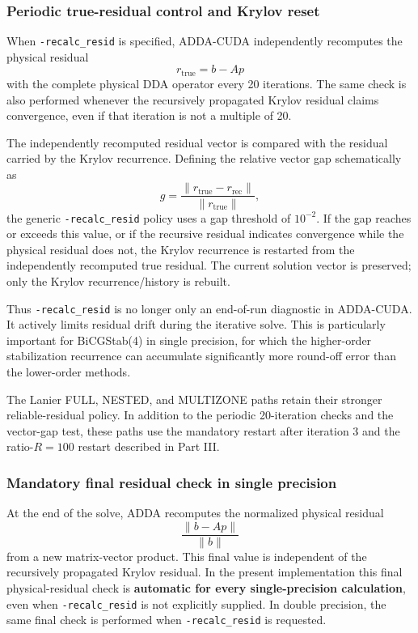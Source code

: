 \documentclass[11pt,a4paper]{article}
\begin{document}
\subsubsection{Periodic true-residual control and Krylov reset}

When \texttt{-recalc\_resid} is specified, ADDA-CUDA independently recomputes the physical residual
\begin{equation}
r_{\mathrm{true}}=b-Ap
\end{equation}
with the complete physical DDA operator every 20 iterations. The same check is also performed whenever the recursively propagated Krylov residual claims convergence, even if that iteration is not a multiple of 20.

The independently recomputed residual vector is compared with the residual carried by the Krylov recurrence. Defining the relative vector gap schematically as
\begin{equation}
 g = \frac{\lVert r_{\mathrm{true}}-r_{\mathrm{rec}}\rVert}
 {\lVert r_{\mathrm{true}}\rVert},
\end{equation}
the generic \texttt{-recalc\_resid} policy uses a gap threshold of \(10^{-2}\). If the gap reaches or exceeds this value, or if the recursive residual indicates convergence while the physical residual does not, the Krylov recurrence is restarted from the independently recomputed true residual. The current solution vector is preserved; only the Krylov recurrence/history is rebuilt.

Thus \texttt{-recalc\_resid} is no longer only an end-of-run diagnostic in ADDA-CUDA. It actively limits residual drift during the iterative solve. This is particularly important for BiCGStab(4) in single precision, for which the higher-order stabilization recurrence can accumulate significantly more round-off error than the lower-order methods.

The Lanier FULL, NESTED, and MULTIZONE paths retain their stronger reliable-residual policy. In addition to the periodic 20-iteration checks and the vector-gap test, these paths use the mandatory restart after iteration 3 and the ratio-\(R=100\) restart described in Part III.

\subsubsection{Mandatory final residual check in single precision}

At the end of the solve, ADDA recomputes the normalized physical residual
\begin{equation}
\frac{\lVert b-Ap\rVert}{\lVert b\rVert}
\end{equation}
from a new matrix-vector product. This final value is independent of the recursively propagated Krylov residual. In the present implementation this final physical-residual check is \textbf{automatic for every single-precision calculation}, even when \texttt{-recalc\_resid} is not explicitly supplied. In double precision, the same final check is performed when \texttt{-recalc\_resid} is requested.
\end{document}
